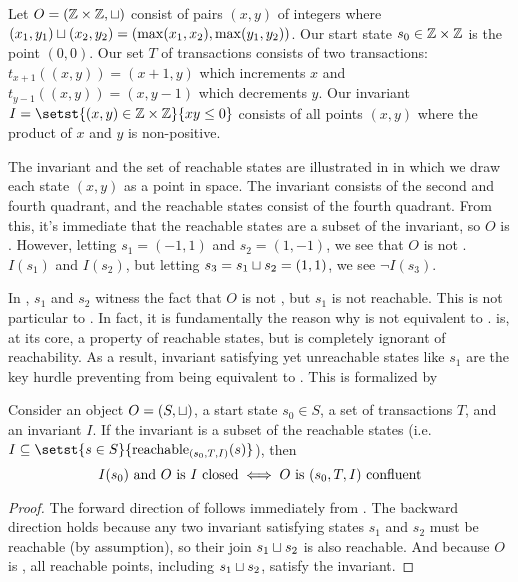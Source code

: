 \begin{example}
  Let $O = (\mathbb{Z} \times \mathbb{Z}, \sqcup)$ consist of pairs $(x, y)$ of integers
  where $(x_1, y_1) \sqcup (x_2, y_2) = (\max(x_1, x_2), \max(y_1, y_2))$. Our
  start state $s_0 \in \mathbb{Z} \times \mathbb{Z}$ is the point $(0, 0)$. Our set $T$
  of transactions consists of two transactions: $t_{x+1}((x, y)) = (x + 1, y)$
  which increments $x$ and $t_{y-1}((x, y)) = (x, y - 1)$ which decrements $y$.
  Our invariant $I = \setst{(x, y) \in \ints \times \ints}{xy \leq 0}$ consists
  of all points $(x, y)$ where the product of $x$ and $y$ is non-positive.

  The invariant and the set of reachable states are illustrated in 
  in which we draw each state $(x, y)$ as a point in space. The invariant
  consists of the second and fourth quadrant, and the reachable states consist
  of the fourth quadrant. From this, it's immediate that the reachable states
  are a subset of the invariant, so $O$ is \invariantconfluent{}. However,
  letting $s_1 = (-1, 1)$ and $s_2 = (1, -1)$, we see that $O$ is not
  \invariantclosed{}. $I(s_1)$ and $I(s_2)$, but letting $s_3 = s_1 \sqcup s_2 =
  (1, 1)$, we see $\lnot I(s_3)$.
\end{example}

{}

In , $s_1$ and $s_2$ witness the fact that $O$ is not
\invariantclosed{}, but $s_1$ is not reachable. This is not particular to
. In fact, it is fundamentally the reason why \invariantclosure{}
is not equivalent to \invariantconfluence{}. \Invariantconfluence{} is, at its
core, a property of reachable states, but \invariantclosure{} is completely
ignorant of reachability. As a result, invariant satisfying yet unreachable
states like $s_1$ are the key hurdle preventing \invariantclosure{} from being
equivalent to \invariantconfluence{}. This is formalized by

\begin{theorem}
  Consider an object $O = (S, \sqcup)$, a start state $s_0 \in S$, a set of
  transactions $T$, and an invariant $I$. If the invariant is a subset of the
  reachable states (i.e. $I \subseteq \setst{s \in S}{\sTIreachablepredicate{s}}$), then
  \[
    \text{$I(s_0)$ and $O$ is $I$ closed{}} \iff \text{$O$ is $(s_0, T, I)$ confluent{}}
  \]
\end{theorem}
\begin{proof}
  The forward direction of  follows
  immediately from . The backward direction
  holds because any two invariant satisfying states $s_1$ and $s_2$ must be
  reachable (by assumption), so their join $s_1 \sqcup s_2$ is also reachable.
  And because $O$ is \sTIconfluent{}, all reachable points, including $s_1
  \sqcup s_2$, satisfy the invariant.
\end{proof}

